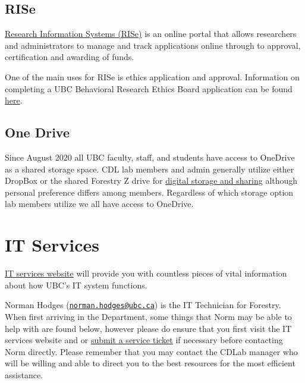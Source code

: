 \documentclass[
]{book}
\begin{document}
\hypertarget{rise}{%
\section*{RISe}\label{rise}}

\href{https://www.rise.ubc.ca/}{Research Information Systems (RISe)} is an online portal that allows researchers and administrators to manage and track applications online through to approval, certification and awarding of funds.

One of the main uses for RISe is ethics application and approval. Information on completing a UBC Behavioral Research Ethics Board application can be found \href{https://ethics.research.ubc.ca/behavioural-research-ethics/breb-guidance-notes}{here}.

\hypertarget{onedrive}{%
\section*{One Drive}\label{onedrive}}

Since August 2020 all UBC faculty, staff, and students have access to OneDrive as a shared storage space. CDL lab members and admin generally utilize either DropBox or the shared Forestry Z drive for \protect\hyperlink{shareddigital}{digital storage and sharing} although personal preference differs among members. Regardless of which storage option lab members utilize we all have access to OneDrive.

\hypertarget{itservices}{%
\chapter*{IT Services}\label{itservices}}

\href{https://it.ubc.ca/}{IT services website} will provide you with countless pieces of vital information about how UBC's IT system functions.

Norman Hodges (\href{mailto:norman.hodges@ubc.ca}{\nolinkurl{norman.hodges@ubc.ca}}) is the IT Technician for Forestry. When first arriving in the Department, some things that Norm may be able to help with are found below, however please do ensure that you first visit the IT services website and or \href{https://ubc.service-now.com/selfservice}{submit a service ticket} if necessary before contacting Norm directly. Please remember that you may contact the CDLab manager who will be willing and able to direct you to the best resources for the most efficient assistance.
\end{document}
